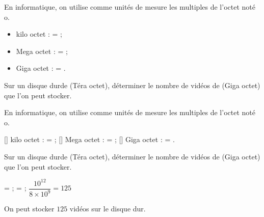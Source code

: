 \begin{exercice*}
    En informatique, on utilise comme unités de mesure les multiples de l’octet noté o.
    \begin{itemize}
        \item kilo octet :  = ;
        \item Mega octet :  = ;
        \item Giga octet :  = .
    \end{itemize}
Sur un disque durde  (Téra octet), déterminer le nombre de vidéos de  (Giga octet)
que l'on peut stocker.
    
\end{exercice*}
\begin{corrige}
    En informatique, on utilise comme unités de mesure les multiples de l’octet noté o.

    \begin{itemize}
        \def\item{}
        \item[] kilo octet :  = ;
        \item[] Mega octet :  = ;
        \item[] Giga octet :  = .
    \end{itemize}

    Sur un disque durde  (Téra octet), déterminer le nombre de vidéos de  (Giga octet)
    que l'on peut stocker.

    {\red
     = ;  = ; $\dfrac{10^{12}}{8\times 10^9} = 125$
    
    On peut stocker $125$ vidéos sur le disque dur.
    }
\end{corrige}


